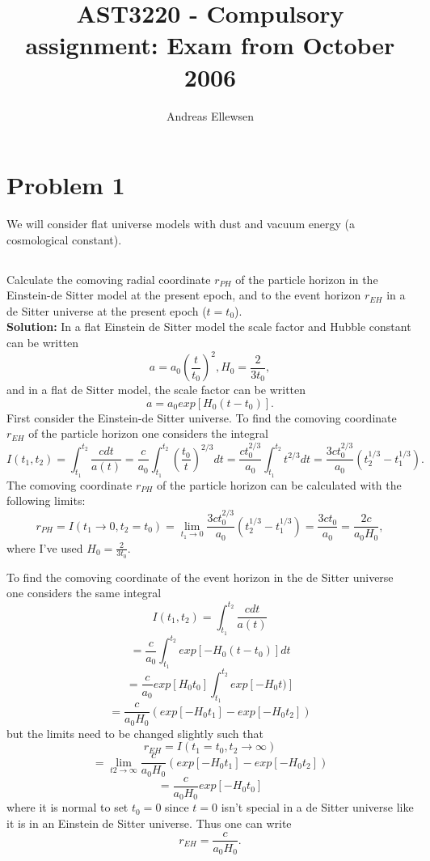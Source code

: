 \documentclass[a4paper,12pt]{article}
\title{AST3220 - Compulsory assignment: Exam from October 2006}
\author{Andreas Ellewsen}
\begin{document}
\maketitle
\section{Problem 1}
We will consider flat universe models with dust and vacuum energy (a cosmological constant).
\subsection{}
Calculate the comoving radial coordinate $r_{PH}$ of the particle horizon in the Einstein-de Sitter model at the present epoch, and to the event horizon $r_{EH}$ in a de Sitter universe at the present epoch ($t=t_{0}$).\\
\textbf{Solution:}
In a flat Einstein de Sitter model the scale factor and Hubble constant can be written 
\begin{equation}
a = a_0(\frac{t}{t_0})^2 , H_0 = \frac{2}{3t_0},
\end{equation}
and in a flat de Sitter model, the scale factor can be written
\begin{equation}
a = a_0exp[H_0(t-t_0)].
\end{equation}
First consider the Einstein-de Sitter universe. To find the comoving coordinate $r_ {EH}$ of the particle horizon one considers the integral
$$I(t_1,t_2) = \int_{t_1}^{t_2}\frac{cdt}{a(t)} = \frac{c}{a_0}\int_{t_1}^{t_2}(\frac{t_0}{t})^{2/3}dt = \frac{ct_0^{2/3}}{a_0}\int_{t_1}^{t_2}t^{2/3}dt = \frac{3ct_0^{2/3}}{a_0}(t_2^{1/3} - t_1^{1/3}).$$
The comoving coordinate $r_{PH}$ of the particle horizon can be calculated with the following limits:
$$r_{PH} = I(t_1\to0,t_2=t_0)= \lim_{t_1 \to 0}\frac{3ct_0^{2/3}}{a_0}(t_2^{1/3} - t_1^{1/3})= \frac{3ct_0}{a_0} = \frac{2c}{a_0H_0},$$
where I've used $H_0 = \frac{2}{3t_0}$.

To find the comoving coordinate of the event horizon in the de Sitter universe one considers the same integral
$$I(t_1,t_2) = \int_{t_1}^{t_2}\frac{cdt}{a(t)}$$ 
$$= \frac{c}{a_0}\int_{t_1}^{t_2}exp[-H_0(t-t_0)]dt $$
$$= \frac{c}{a_0}exp[H_0t_0]\int_{t_1}^{t_2}exp[-H_0t)] $$
$$= \frac{c}{a_0H_0}(exp[-H_0t_1]-exp[-H_0t_2]) $$
but the limits need to be changed slightly such that 
$$r_{EH} = I(t_1=t_0, t_2\to\infty)$$
$$= \lim_{t2\to\infty}\frac{c}{a_0H_0}(exp[-H_0t_1]-exp[-H_0t_2])$$
$$ = \frac{c}{a_0H_0}exp[-H_0t_0]$$
where it is normal to set $t_0 = 0$ since $t = 0$ isn't special in a de Sitter universe like it is in an Einstein de Sitter universe. Thus one can write $$r_{EH} = \frac{c}{a_0H_0}.$$
\end{document}

